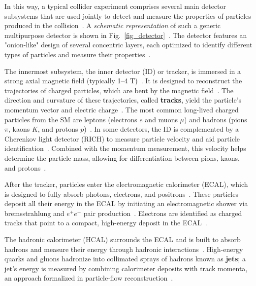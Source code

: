 In this way, a typical collider experiment comprises several main detector subsystems that are used jointly to detect and measure the properties of particles produced in the collision~\cite{CMS:2008xjf,ATLAS:2008xda,deFavereau:2013fsa,CMS:PF2017}. A \textit{schematic representation} of such a generic multipurpose detector is shown in Fig.~\ref{fig_detector}~\cite{CMS:2008xjf,deFavereau:2013fsa}. The detector features an "onion-like" design of several concentric layers, each optimized to identify different types of particles and measure their properties~\cite{CMS:2008xjf,CMS:PF2017}.

The innermost subsystem, the inner detector (ID) or tracker, is immersed in a strong axial magnetic field (typically 1--4 T)~\cite{CMS:2008xjf,CMS:TRK2014}. It is designed to reconstruct the trajectories of charged particles, which are bent by the magnetic field~\cite{CMS:TRK2014,CMS:PF2017}. The direction and curvature of these trajectories, called \textbf{tracks}, yield the particle's momentum vector and electric charge~\cite{CMS:TRK2014,1674-1137-40-10-100001}. The most common long-lived charged particles from the SM are leptons (electrons $e$ and muons $\mu$) and hadrons (pions $\pi$, kaons $K$, and protons $p$)~\cite{1674-1137-40-10-100001}. In some detectors, the ID is complemented by a Cherenkov light detector (RICH) to measure particle velocity and aid particle identification~\cite{1674-1137-40-10-100001,Leo_1994}. Combined with the momentum measurement, this velocity helps determine the particle mass, allowing for differentiation between pions, kaons, and protons~\cite{1674-1137-40-10-100001,Leo_1994}.

After the tracker, particles enter the electromagnetic calorimeter (ECAL), which is designed to fully absorb photons, electrons, and positrons~\cite{CMS_EGM_17001,CMS:2008xjf}. These particles deposit all their energy in the ECAL by initiating an electromagnetic shower via bremsstrahlung and $e^{+}e^{-}$ pair production~\cite{CMS_EGM_17001}. Electrons are identified as charged tracks that point to a compact, high-energy deposit in the ECAL~\cite{CMS_EGM_17001}.

The hadronic calorimeter (HCAL) surrounds the ECAL and is built to absorb hadrons and measure their energy through hadronic interactions~\cite{CMS:2008xjf,deFavereau:2013fsa}. High-energy quarks and gluons hadronize into collimated sprays of hadrons known as \textbf{jets}; a jet's energy is measured by combining calorimeter deposits with track momenta, an approach formalized in particle‑flow reconstruction~\cite{CMS:PF2017,Cacciari:2011ma,Cacciari:2008gp}.

